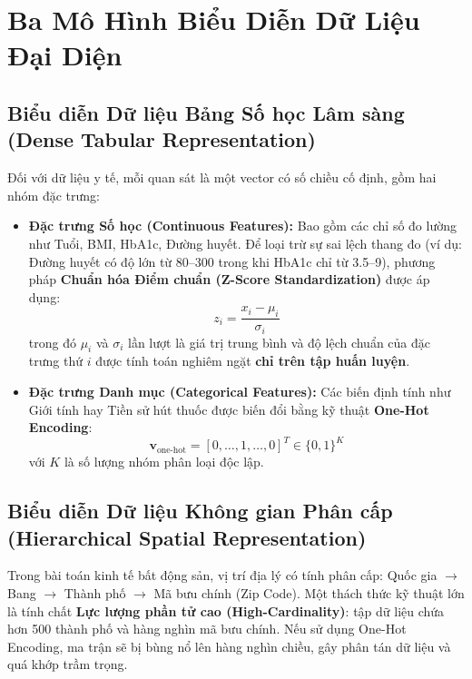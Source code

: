 \documentclass[12pt,a4paper]{report}
\begin{document}
\section{Ba Mô Hình Biểu Diễn Dữ Liệu Đại Diện}

\subsection{Biểu diễn Dữ liệu Bảng Số học Lâm sàng (Dense Tabular Representation)}
Đối với dữ liệu y tế, mỗi quan sát là một vector có số chiều cố định, gồm hai nhóm đặc trưng:
\begin{itemize}[leftmargin=2em]
    \item \textbf{Đặc trưng Số học (Continuous Features):} Bao gồm các chỉ số đo lường như Tuổi, BMI, HbA1c, Đường huyết. Để loại trừ sự sai lệch thang đo (ví dụ: Đường huyết có độ lớn từ 80--300 trong khi HbA1c chỉ từ 3.5--9), phương pháp \textbf{Chuẩn hóa Điểm chuẩn (Z-Score Standardization)} được áp dụng:
    \begin{equation}
    z_i = \frac{x_i - \mu_i}{\sigma_i}
    \end{equation}
    trong đó $\mu_i$ và $\sigma_i$ lần lượt là giá trị trung bình và độ lệch chuẩn của đặc trưng thứ $i$ được tính toán nghiêm ngặt \textbf{chỉ trên tập huấn luyện}.
    \item \textbf{Đặc trưng Danh mục (Categorical Features):} Các biến định tính như Giới tính hay Tiền sử hút thuốc được biến đổi bằng kỹ thuật \textbf{One-Hot Encoding}:
    \begin{equation}
    \mathbf{v}_{\text{one-hot}} = [0, \dots, 1, \dots, 0]^T \in \{0, 1\}^K
    \end{equation}
    với $K$ là số lượng nhóm phân loại độc lập.
\end{itemize}

\subsection{Biểu diễn Dữ liệu Không gian Phân cấp (Hierarchical Spatial Representation)}
Trong bài toán kinh tế bất động sản, vị trí địa lý có tính phân cấp: Quốc gia $\rightarrow$ Bang $\rightarrow$ Thành phố $\rightarrow$ Mã bưu chính (Zip Code). Một thách thức kỹ thuật lớn là tính chất \textbf{Lực lượng phần tử cao (High-Cardinality)}: tập dữ liệu chứa hơn 500 thành phố và hàng nghìn mã bưu chính. Nếu sử dụng One-Hot Encoding, ma trận sẽ bị bùng nổ lên hàng nghìn chiều, gây phân tán dữ liệu và quá khớp trầm trọng.
\end{document}
